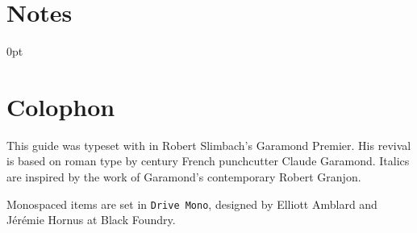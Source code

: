 \backmatter


\chapter{Notes}


\newlength{\enotewidth}
\settowidth{\enotewidth}{00.\enspace}

\renewcommand\enoteheading{}
\renewcommand\makeenmark{\theenmark.\enspace}
\renewcommand\enotesize{\normalsize}
\renewcommand\enoteformat{\leavevmode\llap{\makeenmark}}
\begin{adjustwidth}{\enotewidth}{0pt}
\raggedright
\theendnotes
\end{adjustwidth}

\chapter{Colophon}

This guide was typeset with \LuaLaTeX{} in Robert Slimbach's Garamond Premier.
His revival is based on roman type by
 century French
punchcutter Claude Garamond.
Italics are inspired by the work of Garamond's contemporary Robert Granjon.

Monospaced items are set in \texttt{Drive Mono},
designed by Elliott Amblard and Jérémie Hornus at Black Foundry.


